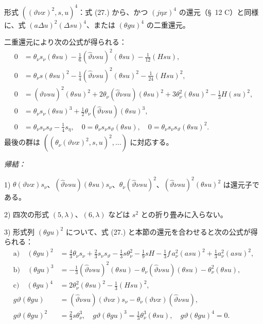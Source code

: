 \documentclass[11pt]{article}
\newcommand{\A}{\Delta}
\begin{document}
形式 $((\vartheta\nu x)^2,s,u)^4$：式 (27.) から、かつ $(j\eta x)^4$ の還元（\S\ 12 C）と同様に、式 $(a\A u)^2(\A su)^4$、または $(\theta gu)^4$ の二重還元。

二重還元により次の公式が得られる：
\[
\tag{28}
\begin{aligned}
0&=\theta_\nu s_\nu(\theta su)-\frac16(\widehat\vartheta\nu su)^2(\theta su)-\frac1{12}(Hsu),\\
0&=\theta_\nu s(\theta su)^2-\frac14(\widehat\vartheta\nu su)^2(\theta su)^2-\frac1{24}(Hsu)^2,\\
0&=(\widehat\vartheta\nu su)^2(\theta su)^2+2\theta_\nu(\widehat\vartheta\nu su)(\theta su)^2
  +3\theta_\nu^2(\theta su)^2-\frac13H(su)^2,\\
0&=\theta_\nu s_\nu(\theta su)^3+\frac12\theta_\nu(\widehat\vartheta\nu su)(\theta su)^3,\\
0&=\theta_\nu s_\nu s_\vartheta-\frac14s_\eta,
\quad 0=\theta_\nu s_\nu s_\vartheta(\theta su),
\quad 0=\theta_\nu s_\nu s_\vartheta(\theta su)^2.
\end{aligned}
\]
最後の群は $((\theta_\nu(\vartheta\nu x)^2,s,u)^2,\ldots)$ に対応する。

\noindent\emph{帰結：}

1) $\theta(\vartheta\nu x)s_\nu$、$(\widehat\vartheta\nu su)(\theta su)s_\nu$、$\theta_\nu(\widehat\vartheta\nu su)^2$、$(\widehat\vartheta\nu su)^2(\theta su)^2$ は還元子である。

2) 四次の形式 $(5,\lambda)$、$(6,\lambda)$ などは $s^2$ との折り畳みに入らない。

3) 形式列 $(\theta gu)^2$ について、式 (27.) と本節の還元を合わせると次の公式が得られる：
\[
\tag{29}
\begin{aligned}
\text{a)}\quad (\theta gu)^2&=\frac43\theta_\nu s_\nu+\frac23s_\nu s_\vartheta-\frac13s\theta_\nu^2-\frac19sH-\frac13f\,a_\nu^2(asu)^2+\frac13a_\nu^2(asu)^2,\\
\text{b)}\quad (\theta gu)^3&=-\frac13(\widehat\vartheta\nu su)^2(\theta su)-\theta_\nu(\widehat\vartheta\nu su)(\theta su)-\theta_\nu^2(\theta su),\\
\text{c)}\quad (\theta gu)^4&=2\theta_\nu^2(\theta su)^2-\frac13(Hsu)^2,\\
g\vartheta(\theta gu)&=(\widehat\vartheta\nu su)(\vartheta\nu x)s_\nu-\theta_\nu(\vartheta\nu x)(\widehat\vartheta\nu su),\\
g\vartheta(\theta gu)^2&=\frac23s\theta_\nu^3,
\quad g\vartheta(\theta gu)^3=\frac13\theta_\nu^3(\theta su),
\quad g\vartheta(\theta gu)^4=0.
\end{aligned}
\]
\end{document}
